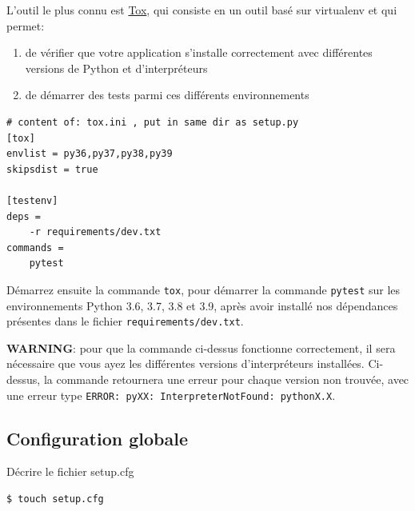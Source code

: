 \documentclass[11pt]{amsbook}
\newcommand{\admonition}[2]{\textbf{#1}: {#2}}
\begin{document}
L’outil le plus connu est \href{https://tox.readthedocs.io/en/latest/}{Tox}, qui consiste en un outil basé sur virtualenv et qui permet:


\begin{enumerate}

\item{de vérifier que votre application s’installe correctement avec différentes versions de Python et d’interpréteurs}

\item{de démarrer des tests parmi ces différents environnements}

\end{enumerate}


\begin{verbatim}
# content of: tox.ini , put in same dir as setup.py
[tox]
envlist = py36,py37,py38,py39
skipsdist = true

[testenv]
deps =
    -r requirements/dev.txt
commands =
    pytest
\end{verbatim}

Démarrez ensuite la commande \texttt{tox}, pour démarrer la commande \texttt{pytest} sur les environnements Python 3.6, 3.7, 3.8 et 3.9, après avoir installé nos dépendances présentes dans le fichier \texttt{requirements/dev.txt}.


\admonition{WARNING}{pour que la commande ci-dessus fonctionne correctement, il sera nécessaire que vous ayez les différentes versions d’interpréteurs installées.
Ci-dessus, la commande retournera une erreur pour chaque version non trouvée, avec une erreur type \texttt{ERROR:   pyXX: InterpreterNotFound: pythonX.X}.}
\hypertarget{x-configuration-globale}{\subsection{Configuration globale}}
Décrire le fichier setup.cfg


\begin{verbatim}
$ touch setup.cfg
\end{verbatim}
\end{document}
